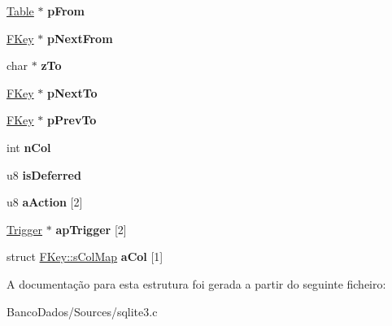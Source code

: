 \begin{DoxyCompactItemize}
\item 
\hypertarget{struct_f_key_a6d476f3fbfa75a19c5c5a9edec4e79eb}{\hyperlink{struct_table}{Table} $\ast$ {\bfseries p\-From}}\label{struct_f_key_a6d476f3fbfa75a19c5c5a9edec4e79eb}

\item 
\hypertarget{struct_f_key_ac64ff66b30167715c8822a74c2809075}{\hyperlink{struct_f_key}{F\-Key} $\ast$ {\bfseries p\-Next\-From}}\label{struct_f_key_ac64ff66b30167715c8822a74c2809075}

\item 
\hypertarget{struct_f_key_a1eac10bab38a0ac9f88306fbbabbe5d6}{char $\ast$ {\bfseries z\-To}}\label{struct_f_key_a1eac10bab38a0ac9f88306fbbabbe5d6}

\item 
\hypertarget{struct_f_key_ac29b26999113602e7e3921bf07643c04}{\hyperlink{struct_f_key}{F\-Key} $\ast$ {\bfseries p\-Next\-To}}\label{struct_f_key_ac29b26999113602e7e3921bf07643c04}

\item 
\hypertarget{struct_f_key_a56189e420e91df86513e6895db518eca}{\hyperlink{struct_f_key}{F\-Key} $\ast$ {\bfseries p\-Prev\-To}}\label{struct_f_key_a56189e420e91df86513e6895db518eca}

\item 
\hypertarget{struct_f_key_a611e3223f3f434e0a635e036dc100cbb}{int {\bfseries n\-Col}}\label{struct_f_key_a611e3223f3f434e0a635e036dc100cbb}

\item 
\hypertarget{struct_f_key_ab742714b17f2c13353837e1fdde51cc7}{u8 {\bfseries is\-Deferred}}\label{struct_f_key_ab742714b17f2c13353837e1fdde51cc7}

\item 
\hypertarget{struct_f_key_a68a08f58294bf845e9c77d785499d222}{u8 {\bfseries a\-Action} \mbox{[}2\mbox{]}}\label{struct_f_key_a68a08f58294bf845e9c77d785499d222}

\item 
\hypertarget{struct_f_key_a9ce15cb27b675836bc714ab18fd8a008}{\hyperlink{struct_trigger}{Trigger} $\ast$ {\bfseries ap\-Trigger} \mbox{[}2\mbox{]}}\label{struct_f_key_a9ce15cb27b675836bc714ab18fd8a008}

\item 
\hypertarget{struct_f_key_a5b230bc6c10a67f432ed7d5ebc92bcd2}{struct \hyperlink{struct_f_key_1_1s_col_map}{F\-Key\-::s\-Col\-Map} {\bfseries a\-Col} \mbox{[}1\mbox{]}}\label{struct_f_key_a5b230bc6c10a67f432ed7d5ebc92bcd2}

\end{DoxyCompactItemize}


A documentação para esta estrutura foi gerada a partir do seguinte ficheiro\-:\begin{DoxyCompactItemize}
\item 
Banco\-Dados/\-Sources/sqlite3.\-c\end{DoxyCompactItemize}

